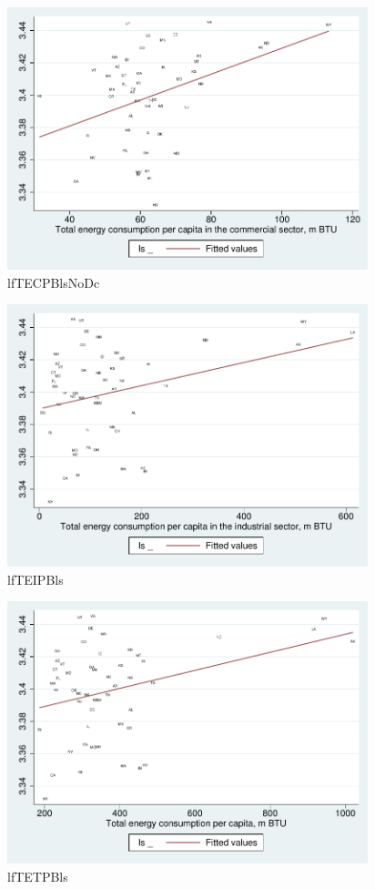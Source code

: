 \documentclass[10pt, letterpaper]{article}
\begin{document}
\begin{spacing}{1.4}
\begin{figure}[H]
 \includegraphics[height=3in]{graphsAndTables/lfTECPBlsNoDc.pdf}\centering
\caption{lfTECPBlsNoDc}\label{lfTECPBlsNoDc}
\end{figure}

\begin{figure}[H]
 \includegraphics[height=3in]{graphsAndTables/lfTEIPBls.pdf}\centering
\caption{lfTEIPBls}\label{lfTEIPBls}
\end{figure}

\begin{figure}[H]
 \includegraphics[height=3in]{graphsAndTables/lfTETPBls.pdf}\centering
\caption{lfTETPBls}\label{lfTETPBls}
\end{figure}



\end{spacing}
\end{document}
